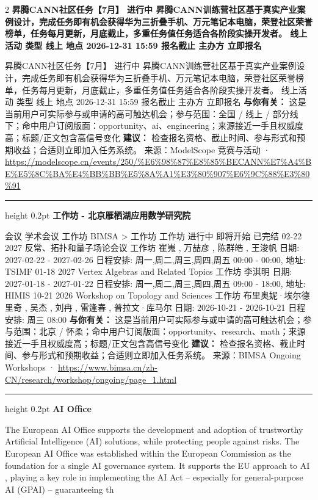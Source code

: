 \documentclass[10.5pt]{ctexart}
\begin{document}
\begin{multicols}{2}
{\large\bfseries 昇腾CANN社区任务【7月】 进行中 昇腾CANN训练营社区基于真实产业案例设计，完成任务即有机会获得华为三折叠手机、万元笔记本电脑，荣登社区荣誉榜单，任务每月更新，月底截止，多重任务值任务适合各阶段实操开发者。 线上活动 类型 线上 地点 2026-12-31 15:59 报名截止 主办方 立即报名}\par
昇腾CANN社区任务【7月】 进行中 昇腾CANN训练营社区基于真实产业案例设计，完成任务即有机会获得华为三折叠手机、万元笔记本电脑，荣登社区荣誉榜单，任务每月更新，月底截止，多重任务值任务适合各阶段实操开发者。 线上活动 类型 线上 地点 2026-12-31 15:59 报名截止 主办方 立即报名
\textbf{与你有关：} 这是当前用户可实际参与或申请的高可触达机会；参与范围：全国 / 线上 / 部分线下；命中用户订阅版面：opportunity、ai、engineering；来源接近一手且权威度高；标题/正文包含高信号变化
\textbf{建议：} 检查报名资格、截止时间、参与形式和预期收益；合适则立即加入任务系统。
{\footnotesize\color{ormuted} 来源：ModelScope 竞赛与活动 · \url{https://modelscope.cn/events/250/%E6%98%87%E8%85%BECANN%E7%A4%BE%E5%8C%BA%E4%BB%BB%E5%8A%A1%E3%80%907%E6%9C%88%E3%80%91}}
\vspace{2mm}
\hrule height 0.2pt
\vspace{2mm}
{\large\bfseries 工作坊 - 北京雁栖湖应用数学研究院}\par
会议 学术会议 工作坊 BIMSA > 工作坊 工作坊 进行中 即将开始 已完结 02-22 2027 反常、拓扑和量子场论会议 工作坊 崔嵬 , 万喆彦 , 陈群皓 , 王浚帆 日期: 2027-02-22 - 2027-02-26 日程安排: 周一,周二,周三,周四,周五 00:00 - 00:00, 地址: TSIMF 01-18 2027 Vertex Algebras and Related Topics 工作坊 李淇明 日期: 2027-01-18 - 2027-01-22 日程安排: 周一,周二,周三,周四,周五 09:00 - 18:00, 地址: HIMIS 10-21 2026 Workshop on Topology and Sciences 工作坊 布里奥妮·埃尔德里奇 , 吴杰 , 刘冉 , 雷逢春 , 普拉文·库马尔 日期: 2026-10-21 - 2026-10-21 日程安排: 周三 08:00
\textbf{与你有关：} 这是当前用户可实际参与或申请的高可触达机会；参与范围：北京 / 怀柔；命中用户订阅版面：opportunity、research、math；来源接近一手且权威度高；标题/正文包含高信号变化
\textbf{建议：} 检查报名资格、截止时间、参与形式和预期收益；合适则立即加入任务系统。
{\footnotesize\color{ormuted} 来源：BIMSA Ongoing Workshops · \url{https://www.bimsa.cn/zh-CN/research/workshop/ongoing/page_1.html}}
\vspace{2mm}
\hrule height 0.2pt
\vspace{2mm}
{\large\bfseries AI Office}\par
The European AI Office supports the development and adoption of trustworthy Artificial Intelligence (AI) solutions, while protecting people against risks. The European AI Office was established within the European Commission as the foundation for a single AI governance system. It supports the EU approach to AI , playing a key role in implementing the AI Act – especially for general-purpose AI (GPAI) – guaranteeing th

\end{multicols}
\end{document}
